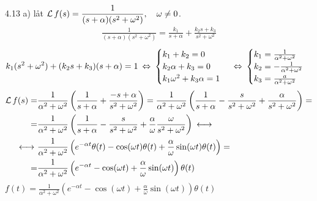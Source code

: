 \begin{task}{4.13 a)}
	låt $\operatorname{\mathcal{L}} f(s)=\dfrac{1}{(s+\alpha)(s^2+\omega^2)}, \quad \omega \neq 0$.
	\begin{align*}
	\frac{1}{(s+\alpha)(s^2+\omega^2)}=
	\frac{k_1}{s+\alpha}+\frac{k_2s+k_3}{s^2+\omega^2}
	\end{align*}
	\[k_1(s^2+\omega^2)+(k_2s+k_3)(s+\alpha)=1\lra
	\begin{cases}
	k_1+k_2=0 \\
	k_2\alpha +k_3=0 \\
	k_1\omega^2+k_3\alpha=1
	\end{cases}\lra
	\begin{cases}
	k_1=\frac{1}{\alpha^2+\omega^2} \\
	k_2=-\frac{1}{\alpha^2+\omega^2} \\
	k_3=\frac{a}{\alpha^2+\omega^2}
	\end{cases}\]
	\begin{align*}
	\laplace f(s)=
	&\frac{1}{\alpha^2+\omega^2}\left(\frac{1}{s+\alpha}+\frac{-s+\alpha}{s^2+\omega^2}\right)=
	\frac{1}{\alpha^2+\omega^2}\left(\frac{1}{s+\alpha}-\frac{s}{s^2+\omega^2}+\frac{\alpha}{s^2+\omega^2}\right)= \\ =
	&\frac{1}{\alpha^2+\omega^2}\left(\frac{1}{s+\alpha}-\frac{s}{s^2+\omega^2}+\frac{\alpha}{\omega}\frac{\omega}{s^2+\omega^2}\right) \llra \\ \llra
	&\frac{1}{\alpha^2+\omega^2}\left(e^{-\alpha t}\theta(t)-\cos(\omega t)\theta(t)+\frac{\alpha}{\omega}\sin(\omega t)\theta(t)\right)= \\ =
	&\frac{1}{\alpha^2+\omega^2}\left(e^{-\alpha t}-\cos(\omega t)+\frac{\alpha}{\omega}\sin(\omega t)\right)\theta(t)
	\end{align*}
	\ans $f(t)=\frac{1}{\alpha^2+\omega^2}\left(e^{-\alpha t}-\cos(\omega t)+\frac{\alpha}{\omega}\sin(\omega t)\right)\theta(t)$
\end{task}

